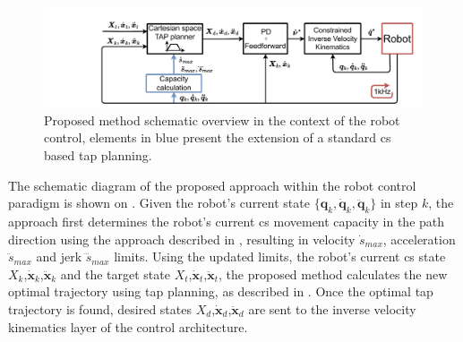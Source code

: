 \begin{figure}[!h]
    \centering
    \includegraphics[trim=3cm 0 0 0, clip=true, width=\linewidth]{Papers/imgs/schema.pdf}
    \caption{Proposed method schematic overview in the context of the robot control, elements in blue present the extension of a standard \gls{cs} based \gls{tap} planning.}
    \label{fig:schema}
\end{figure}

The schematic diagram of the proposed approach within the robot control paradigm is shown on . Given the robot's current state $\{\bm{q}_k,\dot{\bm{q}}_k,\ddot{\bm{q}}_k\}$ in step $k$, the approach first determines the robot's current \gls{cs} movement capacity in the path direction using the approach described in , resulting in velocity $\dot{s}_{max}$, acceleration $\ddot{s}_{max}$ and jerk $\dddot{s}_{max}$ limits. Using the updated limits, the robot's current \gls{cs} state $X_k$,$\dot{\bm{x}}_k$,$\ddot{\bm{x}}_k$ and the target state $X_t$,$\dot{\bm{x}}_t$,$\ddot{\bm{x}}_t$,
the proposed method calculates the new optimal trajectory using \gls{tap} planning, as described in .
Once the optimal \gls{tap} trajectory is found, desired states $X_{d}$,$\dot{\bm{x}}_d$,$\ddot{\bm{x}}_d$ are sent to the inverse velocity kinematics layer of the control architecture. 


